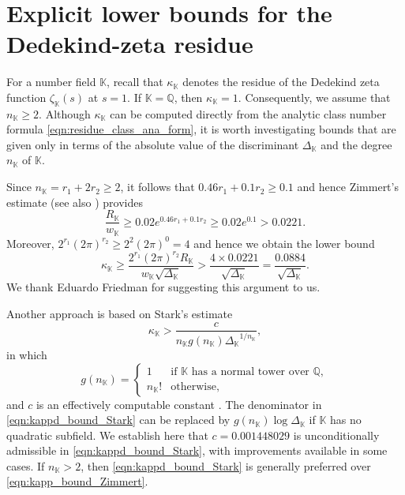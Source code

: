 \documentclass[10pt,reqno]{amsart}
\theoremstyle{plain}
\theoremstyle{definition}
\newcommand{\Q}{\mathbb{Q}}
\newcommand{\K}{\mathbb{K}}
\begin{document}
\section{Explicit lower bounds for the Dedekind-zeta residue}\label{sec:ResidueBounds}
For a number field $\K$, recall that $\kappa_{\K}$ denotes the residue of the Dedekind zeta function
$\zeta_{\K}(s)$ at $s=1$.  If $\K = \Q$, then $\kappa_{\K} = 1$.  Consequently, we assume 
that $n_{\K} \geq 2$. Although $\kappa_{\K}$ can be computed directly from the analytic class 
number formula \eqref{eqn:residue_class_ana_form}, it is worth investigating bounds 
that are given only in terms of the absolute value of the discriminant $\Delta_{\K}$
and the degree $n_{\K}$ of $\K$.

Since $n_{\K} = r_1 + 2r_2\geq 2$, it follows that $0.46r_1 + 0.1r_2 \geq 0.1$ and hence Zimmert's estimate \cite{Zimmert} (see also \cite[Thm.~7, p.~273]{Lang}) provides
\begin{equation*}
    \frac{R_{\K}}{w_{\K}} \geq 0.02 e^{0.46r_1 + 0.1 r_2} \geq 0.02 e^{0.1} > 0.0221.
\end{equation*}
Moreover, $2^{r_1}(2\pi)^{r_2} \geq 2^{2}(2\pi)^{0} = 4$ and hence we obtain the lower bound
\begin{equation}\label{eqn:kapp_bound_Zimmert}
    \kappa_{\K} \geq \frac{2^{r_1}(2\pi)^{r_2}R_{\K}}{w_{\K}\sqrt{\Delta_{\K}}} > \frac{4\times 0.0221}{\sqrt{\Delta_{\K}}} = \frac{0.0884}{\sqrt{\Delta_{\K}}}.
\end{equation}
We thank Eduardo Friedman for suggesting this argument to us.

Another approach is based on Stark's estimate
\begin{equation}\label{eqn:kappd_bound_Stark}
    \kappa_{\K} > \frac{c}{n_{\K} g(n_{\K}){\Delta_{\K}}^{1/n_{\K}}},
\end{equation}
in which
\begin{equation*}
    g(n_{\K}) = \begin{cases}
    1 &\text{if }\K\text{ has a normal tower over }\Q,\\
    n_{\K} ! &\text{otherwise,}
    \end{cases}
\end{equation*}
and $c$ is an effectively computable constant \cite{StarkBS}. The denominator in \eqref{eqn:kappd_bound_Stark} can be replaced by $g(n_{\K})\log{\Delta_{\K}}$ if $\K$ has no quadratic subfield. We establish here that $c = 0.001448029$ is unconditionally admissible in \eqref{eqn:kappd_bound_Stark}, with improvements available in some cases. If $n_{\K} > 2$, then \eqref{eqn:kappd_bound_Stark} is generally preferred over \eqref{eqn:kapp_bound_Zimmert}.
\end{document}

